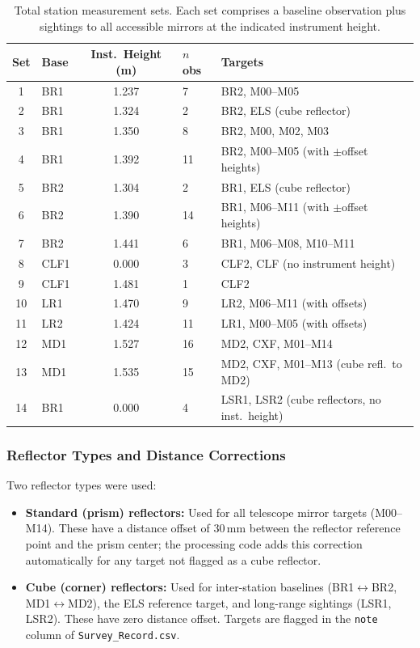 \documentclass[11pt,letterpaper]{article}
\begin{document}
\begin{table}[H]
\centering
\caption{Total station measurement sets. Each set comprises a baseline observation plus sightings to all accessible mirrors at the indicated instrument height.}
\label{tab:measurement_sets}
\smallskip
\footnotesize
\begin{tabular}{@{}clcll@{}}
\toprule
{Set} & {Base} & {Inst.\ Height (m)} & {$n$ obs} & {Targets} \\
\midrule
1  & BR1  & 1.237 & 7  & BR2, M00--M05 \\
2  & BR1  & 1.324 & 2  & BR2, ELS (cube reflector) \\
3  & BR1  & 1.350 & 8  & BR2, M00, M02, M03 \\
4  & BR1  & 1.392 & 11 & BR2, M00--M05 (with $\pm$offset heights) \\
5  & BR2  & 1.304 & 2  & BR1, ELS (cube reflector) \\
6  & BR2  & 1.390 & 14 & BR1, M06--M11 (with $\pm$offset heights) \\
7  & BR2  & 1.441 & 6  & BR1, M06--M08, M10--M11 \\
8  & CLF1 & 0.000 & 3  & CLF2, CLF (no instrument height) \\
9  & CLF1 & 1.481 & 1  & CLF2 \\
10 & LR1  & 1.470 & 9  & LR2, M06--M11 (with offsets) \\
11 & LR2  & 1.424 & 11 & LR1, M00--M05 (with offsets) \\
12 & MD1  & 1.527 & 16 & MD2, CXF, M01--M14 \\
13 & MD1  & 1.535 & 15 & MD2, CXF, M01--M13 (cube refl.\ to MD2) \\
14 & BR1  & 0.000 & 4  & LSR1, LSR2 (cube reflectors, no inst.\ height) \\
\bottomrule
\end{tabular}
\end{table}

\subsubsection{Reflector Types and Distance Corrections}

Two reflector types were used:

\begin{itemize}[nosep]
    \item \textbf{Standard (prism) reflectors:} Used for all telescope mirror targets (M00--M14). These have a distance offset of 30\,mm between the reflector reference point and the prism center; the processing code adds this correction automatically for any target not flagged as a cube reflector.
    \item \textbf{Cube (corner) reflectors:} Used for inter-station baselines (BR1$\leftrightarrow$BR2, MD1$\leftrightarrow$MD2), the ELS reference target, and long-range sightings (LSR1, LSR2). These have zero distance offset. Targets are flagged in the \texttt{note} column of \texttt{Survey\_Record.csv}.
\end{itemize}
\end{document}
